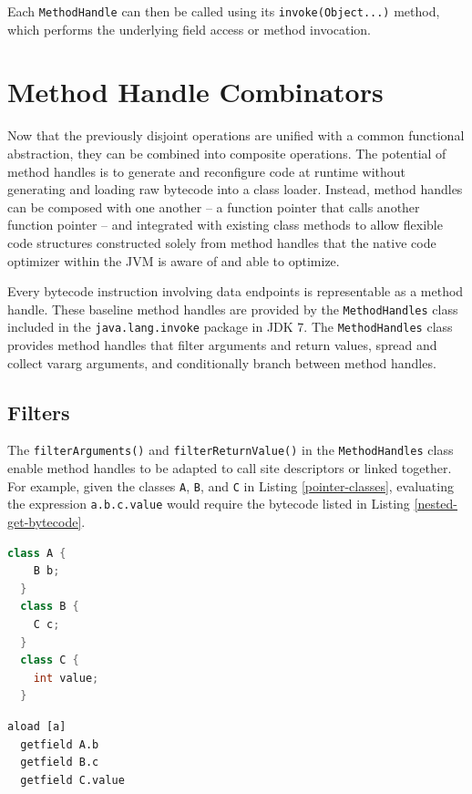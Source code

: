 Each \texttt{MethodHandle} can then be called using its \texttt{invoke(Object...)} method, which performs the underlying field access or method invocation.

\section{Method Handle Combinators}

Now that the previously disjoint operations are unified with a common functional abstraction, they can be combined into composite operations.  The potential of method handles is to generate and reconfigure code at runtime without generating and loading raw bytecode into a class loader.  Instead, method handles can be composed with one another -- a function pointer that calls another function pointer -- and integrated with existing class methods to allow flexible code structures constructed solely from method handles that the native code optimizer within the JVM is aware of and able to optimize.

Every bytecode instruction involving data endpoints is representable as a method handle.  These baseline method handles are provided by the \texttt{MethodHandles} class included in the \texttt{java.lang.invoke} package in JDK 7.  The \texttt{MethodHandles} class provides method handles that filter arguments and return values, spread and collect vararg arguments, and conditionally branch between method handles.

\subsection{Filters}
\label{section:filters}

The \texttt{filterArguments()} and \texttt{filterReturnValue()} in the \texttt{MethodHandles} class enable method handles to be adapted to call site descriptors or linked together.  For example, given the classes \texttt{A}, \texttt{B}, and \texttt{C} in Listing \ref{pointer-classes}, evaluating the expression \texttt{a.b.c.value} would require the bytecode listed in Listing \ref{nested-get-bytecode}.

\begin{lstlisting}[language=Java,caption=Classes to execute \texttt{getfield} instructions against,label=pointer-classes]
  class A {
    B b;
  }
  class B {
    C c;
  }
  class C {
    int value;
  }
\end{lstlisting}
\vspace{2em}
\begin{lstlisting}[language=jvm-bytecode,caption=Nested property accessor bytecode,label=nested-get-bytecode]
  aload [a]
  getfield A.b
  getfield B.c
  getfield C.value
\end{lstlisting}

